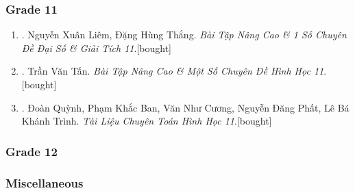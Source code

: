 \documentclass{article}
\begin{document}
\subsubsection{Grade 11}

\begin{enumerate}
	\item \cite{Liem_Thang2020}. Nguyễn Xuân Liêm, Đặng Hùng Thắng. \textit{Bài Tập Nâng Cao \& 1 Số Chuyên Đề Đại Số \& Giải Tích 11}.\hfill\textsf{[bought]}
	\item \cite{Tan2017}. Trần Văn Tấn. \textit{Bài Tập Nâng Cao \& Một Số Chuyên Đề Hình Học 11}.\hfill\textsf{[bought]}
	\item \cite{TL_chuyen_Toan_hinh_hoc_11}. Đoàn Quỳnh, Phạm Khắc Ban, Văn Như Cương, Nguyễn Đăng Phất, Lê Bá Khánh Trình. \textit{Tài Liệu Chuyên Toán Hình Học 11}.\hfill\textsf{[bought]}	
\end{enumerate}

\subsubsection{Grade 12}

\subsubsection{Miscellaneous}
\end{document}
